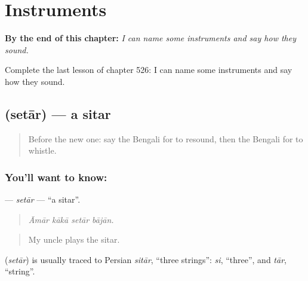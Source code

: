 
\chapter{Instruments}
\label{ch:bn-instruments}

\begin{chapteropening}
\textbf{By the end of this chapter:} \emph{I can name some instruments and say how they sound.}

Complete the last lesson of chapter 526: I can name some instruments and say how they sound.
\end{chapteropening}

\section[\texorpdfstring{\bn{সেতার} (setār)}{সেতার (setār)}]{ (setār) — a sitar}

\label{lesson:BN-C526-setar}



\begin{quote}
Before the new one: say the Bengali for to resound, then the Bengali for to whistle.
\end{quote}

\subsection*{You'll want to know: }
\textbf{} — \emph{setār} — \textquotedblleft{}a sitar\textquotedblright{}.

\begin{quote}
   
\end{quote}

\begin{quote}
\emph{Āmār kākā setār bājān.}
\end{quote}

\begin{quote}
My uncle plays the sitar.
\end{quote}

\begin{cousinweb}
\textbf{} (\emph{setār}) is usually traced to Persian \emph{sitār}, \textquotedblleft{}three strings\textquotedblright{}: \emph{si}, \textquotedblleft{}three\textquotedblright{}, and \emph{tār}, \textquotedblleft{}string\textquotedblright{}.
\end{cousinweb}

